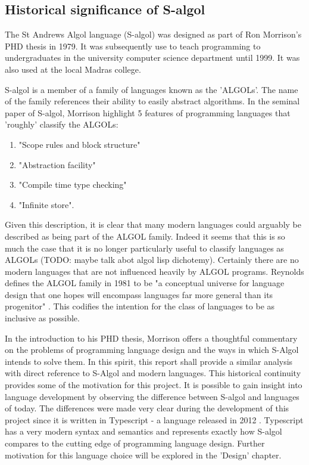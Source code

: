 \documentclass{article}
\begin{document}
\subsection{Historical significance of S-algol}

The St Andrews Algol language (S-algol) was designed as part of Ron Morrison's PHD thesis in 1979. It was subsequently use to teach programming to undergraduates in the university computer science department until 1999. It was also used at the local Madras college.

S-algol is a member of a family of languages known as the 'ALGOLs'. The name of the family references their ability to easily abstract algorithms. In the seminal paper of S-algol, Morrison highlight 5 features of programming languages that 'roughly' classify the ALGOLs:

\begin{enumerate}
    \item "Scope rules and block structure"
    \item "Abstraction facility"
    \item "Compile time type checking"
    \item "Infinite store".
\end{enumerate}

Given this description, it is clear that many modern languages could arguably be described as being part of the ALGOL family. Indeed it seems that this is so much the case that it is no longer particularly useful to classify languages as ALGOLs (TODO: maybe talk abot algol lisp dichotemy). Certainly there are no modern languages that are not influenced heavily by ALGOL programs. Reynolds defines the ALGOL family in 1981 to be "a conceptual universe for language design that one hopes will encompass languages far more general than its progenitor" \cite{reynolds}. This codifies the intention for the class of languages to be as inclusive as possible. 

In the introduction to his PHD thesis, Morrison offers a thoughtful commentary on the problems of programming language design and the ways in which S-Algol intends to solve them. In this spirit, this report shall provide a similar analysis with direct reference to S-Algol and modern languages. This historical continuity provides some of the motivation for this project. It is possible to gain insight into language development by observing the difference between S-algol and languages of today. The differences were made very clear during the development of this project since it is written in Typescript - a language released in 2012 \cite{jsconf}. Typescript has a very modern syntax and semantics and represents exactly how S-algol compares to the cutting edge of programming language design. Further motivation for this language choice will be explored in the 'Design' chapter.
\end{document}

